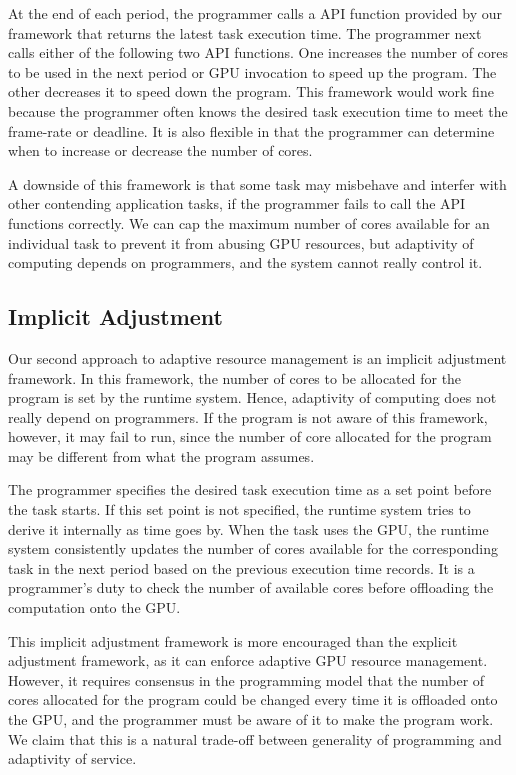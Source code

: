 \documentclass[times, 10pt, twocolumn]{article}
\begin{document}
At the end of each period, the programmer calls a API function provided
by our framework that returns the latest task execution time.
The programmer next calls either of the following two API functions.
One increases the number of cores to be used in the next period or GPU
invocation to speed up the program.
The other decreases it to speed down the program.
This framework would work fine because the programmer often knows the
desired task execution time to meet the frame-rate or deadline.
It is also flexible in that the programmer can determine when to
increase or decrease the number of cores.

A downside of this framework is that some task may misbehave
and interfer with other contending application tasks, if the programmer
fails to call the API functions correctly.
We can cap the maximum number of cores available for an individual task
to prevent it from abusing GPU resources, but adaptivity of computing
depends on programmers, and the system cannot really control it.

\subsection{Implicit Adjustment}

Our second approach to adaptive resource management is an implicit
adjustment framework.
In this framework, the number of cores to be allocated for the program
is set by the runtime system.
Hence, adaptivity of computing does not really depend on programmers.
If the program is not aware of this framework, however, it may fail to
run, since the number of core allocated for the program may be different
from what the program assumes.

The programmer specifies the desired task execution time as a set point
before the task starts.
If this set point is not specified, the runtime system tries to derive
it internally as time goes by.
When the task uses the GPU, the runtime system consistently updates the
number of cores available for the corresponding task in the next period
based on the previous execution time records.
It is a programmer's duty to check the number of available cores before
offloading the computation onto the GPU.

This implicit adjustment framework is more encouraged than the explicit
adjustment framework, as it can enforce adaptive GPU resource
management.
However, it requires consensus in the programming model that the number
of cores allocated for the program could be changed every time it is
offloaded onto the GPU, and the programmer must be aware of it to make
the program work.
We claim that this is a natural trade-off between generality of
programming and adaptivity of service.
\end{document}
